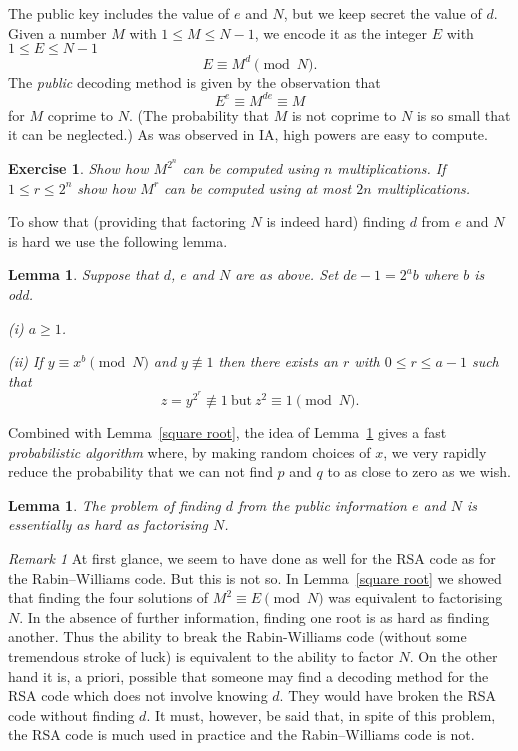 \documentclass[12pt,a4paper]{article}
\theoremstyle{plain}
\newtheorem{lemma}[theorem]{Lemma}
\newtheorem{exercise}[theorem]{Exercise}
\theoremstyle{definition}
\begin{document}
    The public key includes the value of $e$ and $N$,
    but we keep secret the value of $d$. Given
    a number $M$ with $1\leq M\leq N-1$, we encode
    it as the integer $E$ with $1\leq E\leq N-1$
    \[E\equiv M^{d}\pmod{N}.\]
    The \emph{public} decoding method is given by the
    observation that
    \[E^{e}\equiv M^{de}\equiv M\]
    for $M$ coprime to $N$. (The probability that
    $M$ is not coprime to $N$ is so small that it
    can be neglected.)
    As was observed in IA, high powers are easy to compute.

    \begin{exercise}
        Show how $M^{2^{n}}$ can be
        computed using $n$ multiplications. If $1\leq r\leq 2^{n}$
        show how $M^{r}$ can be computed using at most $2n$
        multiplications.
    \end{exercise}


    To show that (providing that factoring $N$ is
    indeed hard) finding $d$ from $e$ and $N$
    is hard we use the following lemma.

    \begin{lemma}
        \label{some root}
        Suppose that $d$, $e$ and $N$ are
        as above. Set $de-1=2^{a}b$ where $b$ is odd.

        (i) $a\geq 1$.

        (ii) If $y\equiv x^{b}\pmod{N}$ and $y\not\equiv 1$
        then there exists
        an $r$ with $0\leq r\leq a-1$ such that
        \[z=y^{2^{r}}\not\equiv 1\ \text{but}
        \ z^{2}\equiv 1\pmod{N}.\]
    \end{lemma}

    Combined with Lemma~\ref{square root}, the idea
    of Lemma~\ref{some root} gives a fast \emph{probabilistic
    algorithm} where, by making random choices of $x$,
    we very rapidly reduce the probability that
    we can not find $p$ and $q$ to as close to zero as we wish.
    \begin{lemma}
        \label{L;fast probable} The problem of finding $d$
        from the public information $e$ and $N$ is
        essentially as hard as factorising $N$.
    \end{lemma}

    \emph{Remark 1} At first glance, we seem to have done as well
    for the RSA code as for the Rabin--Williams code. But
    this is not so. In Lemma~\ref{square root} we showed
    that finding the four solutions of $M^{2}\equiv E \pmod{N}$
    was equivalent to factorising $N$. In the absence
    of further information, finding one root is
    as hard as finding another. Thus the ability to
    break the Rabin-Williams code (without some tremendous
    stroke of luck) is equivalent to the ability to
    factor $N$.
    On the other hand it is, a priori, possible that
    someone may find a decoding method
    for the RSA code which does not involve knowing $d$.
    They would have broken
    the RSA code without finding $d$.
    It must, however, be said that, in spite of this
    problem, the RSA code is much used in practice
    and the Rabin--Williams code is not.
\end{document}
